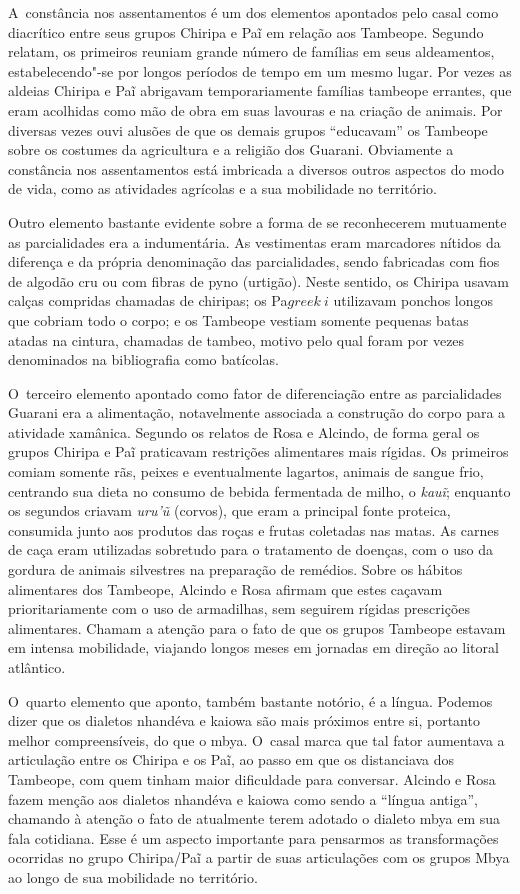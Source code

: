 A~constância nos assentamentos é um dos elementos apontados pelo casal
como diacrítico entre seus grupos Chiripa e Paĩ
em relação aos Tambeope. Segundo relatam, os primeiros reuniam grande
número de famílias em seus aldeamentos, estabelecendo"-se por longos
períodos de tempo em um mesmo lugar. Por vezes as aldeias Chiripa e
Paĩ abrigavam temporariamente famílias tambeope
errantes, que eram acolhidas como mão de obra em suas lavouras e na
criação de animais. Por diversas vezes ouvi alusões de que os demais
grupos ``educavam'' os Tambeope sobre os costumes da agricultura e a
religião dos Guarani. Obviamente a constância nos assentamentos está
imbricada a diversos outros aspectos do modo de vida, como as
atividades agrícolas e a sua mobilidade no território.

Outro elemento bastante evidente sobre a forma de se reconhecerem
mutuamente as parcialidades era a indumentária. As vestimentas eram
marcadores nítidos da diferença e da própria denominação das
parcialidades, sendo fabricadas com fios de algodão cru ou com fibras
de pyno (urtigão). Neste sentido, os Chiripa usavam calças compridas
chamadas de chiripas; os Pa${greek{~i}}$ utilizavam ponchos
longos que cobriam todo o corpo; e os Tambeope vestiam somente pequenas
batas atadas na cintura, chamadas de tambeo, motivo pelo qual foram por
vezes denominados na bibliografia como batícolas.

O~terceiro elemento apontado como fator de diferenciação entre as
parcialidades Guarani era a alimentação, notavelmente associada a
construção do corpo para a atividade xamânica. Segundo os relatos de
Rosa e Alcindo, de forma geral os grupos Chiripa e
Paĩ praticavam restrições alimentares mais
rígidas. Os primeiros comiam somente rãs, peixes e eventualmente
lagartos, animais de sangue frio, centrando sua dieta no consumo de
bebida fermentada de milho, o \emph{kauĩ}; enquanto os
segundos criavam \emph{uru’ũ} (corvos), que eram a principal fonte proteica,
consumida junto aos produtos das roças e frutas coletadas nas matas. As
carnes de caça eram utilizadas sobretudo para o tratamento de doenças,
com o uso da gordura de animais silvestres na preparação de remédios.
Sobre os hábitos alimentares dos Tambeope, Alcindo e Rosa afirmam que
estes caçavam prioritariamente com o uso de armadilhas, sem seguirem
rígidas prescrições alimentares. Chamam a atenção para o fato de que os
grupos Tambeope estavam em intensa mobilidade, viajando longos meses em
jornadas em direção ao litoral atlântico. 

O~quarto elemento que aponto, também bastante notório, é a língua.
Podemos dizer que os dialetos nhandéva e kaiowa são mais próximos entre
si, portanto melhor compreensíveis, do que o mbya. O~casal marca que
tal fator aumentava a articulação entre os Chiripa e os
Paĩ, ao passo em que os distanciava dos Tambeope,
com quem tinham maior dificuldade para conversar. Alcindo e Rosa fazem
menção aos dialetos nhandéva e kaiowa como sendo a ``língua antiga'',
chamando à atenção o fato de atualmente terem adotado o dialeto mbya em
sua fala cotidiana. Esse é um aspecto importante para pensarmos as
transformações ocorridas no grupo Chiripa/Paĩ a
partir de suas articulações com os grupos Mbya ao longo de sua
mobilidade no território.

